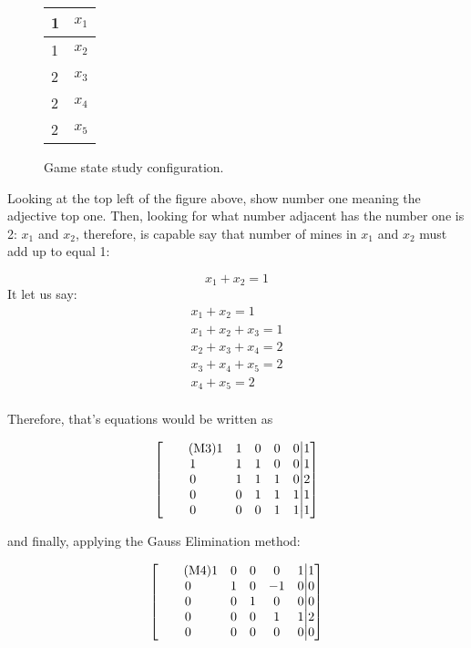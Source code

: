 \documentclass[a4paper]{article}
\numberwithin{equation}{subsection}
\begin{document}
\begin{figure}[h!] \label{fig:1}
\centering
\begin{tabular}{|l|l|}
\hline
1 & $x_1$ \\ \hline
1 & $x_2$ \\ \hline
2 & $x_3$ \\ \hline
2 & $x_4$ \\ \hline
2 & $x_5$ \\ \hline
\end{tabular}
\caption{Game state study configuration.}
\label{fig:1}
\end{figure}

Looking at the top left of the figure above, show number one meaning the adjective top one. Then, looking for what number adjacent has the number one is 2: $x_1$ and $x_2$, therefore, is capable say that number of mines in $x_1$ and $x_2$ must add up to equal 1:


\begin{equation}
x_1+x_2=1\label{eq:first}    \tag{1.5}
\end{equation}
It let us say:
\begin{align} 
x_1+x_2=1 \\        \tag{1.5}    
x_1+x_2+x_3=1 \\    \tag{2.1}  
x_2+x_3+x_4=2   \\    \tag{2.2}
x_3+x_4+ x_5=2   \\    \tag{2.3}
x_4+x_5=2      \\       \tag{2.4}
\end{align}

Therefore, that's equations would be written as 

\begin{equation}
\begin{bmatrix} \tag{M3}
1 & 1 & 0 & 0 & 0 $\big\vert$1 \\
1 & 1 & 1 & 0 & 0 $\big\vert$1  \\
0 & 1 & 1 & 1 & 0 $\big\vert$2 \\
0 & 0 & 1 & 1 & 1 $\big\vert$1 \\
0 & 0 & 0 & 1 & 1 $\big\vert$1
\end{bmatrix} 
\end{equation}

\vspace{5mm} %

and finally, applying the Gauss Elimination method:

\begin{equation}
\begin{bmatrix} \tag{M4}
1 & 0 & 0 & 0 & 1 $\big\vert$1 \\
0 & 1 & 0 & -1 & 0 $\big\vert$0  \\
0 & 0 & 1 & 0 & 0 $\big\vert$0 \\
0 & 0 & 0 & 1 & 1 $\big\vert$2 \\
0 & 0 & 0 & 0 & 0 $\big\vert$0
\end{bmatrix}
\end{equation}
\end{document}
